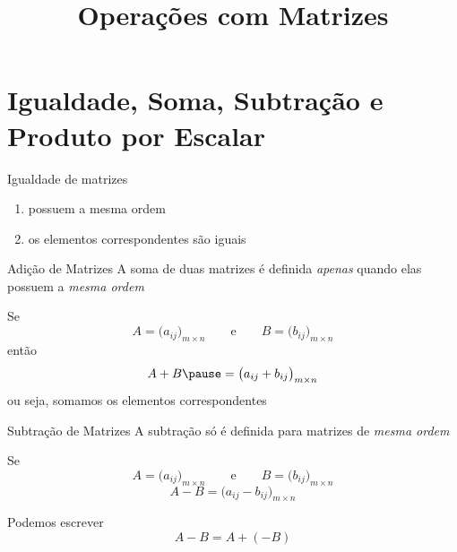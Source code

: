 \documentclass[fleqn,aspectratio=169,12pt]{beamer}
\title{Operações com Matrizes}
\begin{document}
\addtitle

\section{Igualdade, Soma, Subtração e Produto por Escalar}

\begin{frame}{Igualdade de matrizes}
  \begin{enumerate}[<+->]
    \item possuem a mesma ordem
    \item os elementos correspondentes são iguais
  \end{enumerate}

\end{frame}




\begin{frame}{Adição de Matrizes}
A soma de duas matrizes é definida \emph{apenas} quando elas possuem
a \emph{mesma ordem}

\pause
Se
\[
  A = \big( a_{ij} \big)_{m\times n}
  \qquad\text{e}\qquad
  B = \big( b_{ij} \big)_{m\times n}
\]
\pause
então
\[
  A + B
  \pause
  = \big( a_{ij} + b_{ij} \big)_{m\times n}
\]
\pause
ou seja, somamos os elementos correspondentes
\end{frame}




\begin{frame}{Subtração de Matrizes}
A subtração só é definida para matrizes de \emph{mesma ordem}

\pause
Se
\[
  A = \big( a_{ij} \big)_{m\times n}
  \qquad\text{e}\qquad
  B = \big( b_{ij} \big)_{m\times n}
\]
\pause
\[
  A - B = \big( a_{ij} - b_{ij} \big)_{m\times n}
\]

\pause
Podemos escrever
\[
  A - B = A + (-B)
\]
\end{frame}
\end{document}
